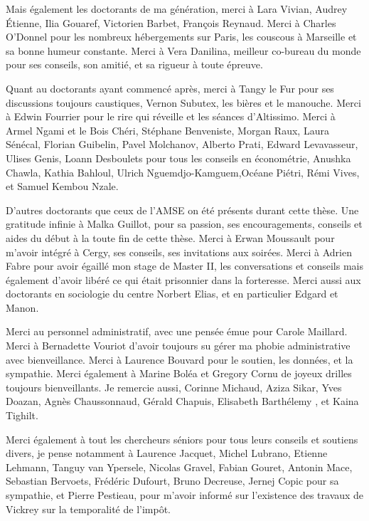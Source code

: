 Mais également les doctorants de ma génération, merci à Lara Vivian, Audrey Étienne, Ilia Gouaref, Victorien Barbet, François Reynaud. Merci à Charles O’Donnel pour les nombreux hébergements sur Paris, les couscous à Marseille et sa bonne humeur constante. Merci à Vera Danilina, meilleur co-bureau du monde pour ses conseils, son amitié, et sa rigueur à toute épreuve.


Quant au doctorants  ayant commencé après, merci à Tangy le Fur pour ses discussions toujours caustiques, Vernon Subutex, les bières et le manouche. Merci à Edwin Fourrier pour le rire qui réveille et les séances d’Altissimo. Merci à Armel Ngami et le Bois Chéri, Stéphane Benveniste, Morgan Raux, Laura  Sénécal, Florian Guibelin, Pavel Molchanov, Alberto Prati, Edward Levavasseur, Ulises Genis, Loann Desboulets pour tous les conseils en économétrie, Anushka Chawla, Kathia Bahloul, Ulrich Nguemdjo-Kamguem,Océane
Piétri, Rémi Vives, et Samuel Kembou Nzale.

\medskip

D’autres doctorants que ceux de l’AMSE on été présents durant cette thèse. Une gratitude infinie à Malka Guillot, pour sa passion, ses encouragements, conseils et aides du début à la toute fin de cette thèse. Merci à Erwan Moussault pour m’avoir intégré à Cergy, ses conseils, ses invitations aux soirées. Merci à Adrien Fabre pour avoir égaillé mon stage de Master II, les conversations et conseils mais également d’avoir libéré ce qui était prisonnier dans la forteresse.  Merci aussi aux doctorants en sociologie du centre Norbert Elias, et en particulier Edgard et Manon.

\medskip

Merci au personnel administratif, avec une pensée émue pour Carole Maillard. Merci à Bernadette Vouriot d’avoir toujours su gérer ma phobie administrative avec bienveillance. Merci à Laurence Bouvard pour le soutien, les données, et la sympathie. Merci également à Marine Boléa et Gregory Cornu de joyeux drilles  toujours bienveillants.
Je remercie aussi, Corinne Michaud, Aziza Sikar, Yves Doazan, Agnès Chaussonnaud, Gérald Chapuis, Elisabeth Barthélemy , et Kaina Tighilt.

\medskip


Merci également à tout les chercheurs séniors pour tous leurs conseils et soutiens divers, je pense notamment à Laurence Jacquet,  Michel Lubrano, Etienne Lehmann, Tanguy van Ypersele, Nicolas Gravel, Fabian Gouret, Antonin Mace, Sebastian Bervoets, Frédéric Dufourt,  Bruno Decreuse, Jernej Copic pour sa sympathie, et Pierre Pestieau, pour m’avoir informé sur l’existence des travaux de Vickrey sur la temporalité de l’impôt.


